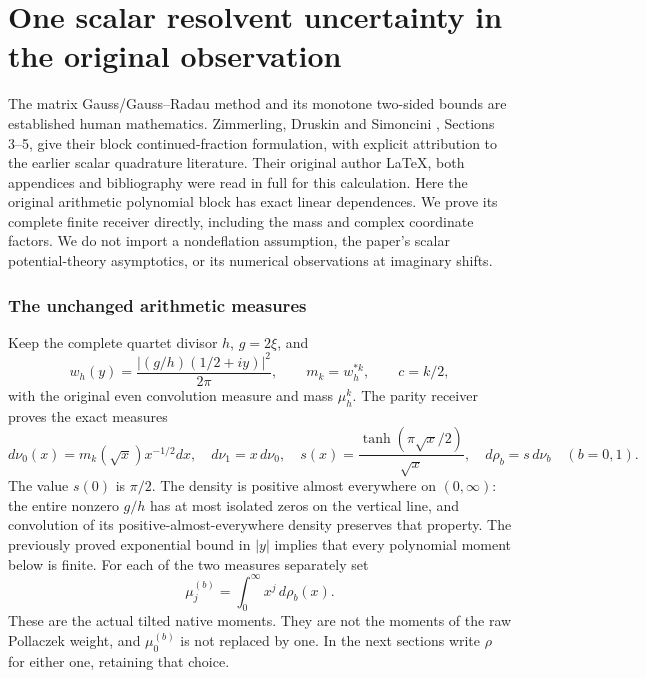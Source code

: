 

\clearpage\begingroup
\part*{One scalar resolvent uncertainty in the original observation}


The matrix Gauss/Gauss--Radau method and its monotone two-sided bounds
are established human mathematics. Zimmerling, Druskin and Simoncini
\cite{rrnative:ZDS}, Sections 3--5, give their block continued-fraction formulation,
with explicit attribution to the earlier scalar quadrature literature.
Their original author LaTeX, both appendices and bibliography were read
in full for this calculation. Here the original arithmetic polynomial
block has exact linear dependences. We prove its complete finite receiver
directly, including the mass and complex coordinate factors. We do not
import a nondeflation assumption, the paper's scalar potential-theory
asymptotics, or its numerical observations at imaginary shifts.

\section{The unchanged arithmetic measures}
Keep the complete quartet divisor $h$, $g=2\xi$, and
\[
 w_h(y)=\frac{|(g/h)(1/2+iy)|^2}{2\pi},\qquad
 m_k=w_h^{*k},\qquad c=k/2,
\]
with the original even convolution measure and mass $\mu_h^k$.
The parity receiver \cite{rrnative:PP} proves the exact measures
\[
 d\nu_0(x)=m_k(\sqrt x)x^{-1/2}dx,\quad d\nu_1=x\,d\nu_0,
 \quad s(x)=\frac{\tanh(\pi\sqrt x/2)}{\sqrt x},\quad
 d\rho_b=s\,d\nu_b\quad(b=0,1).
\]
The value $s(0)$ is $\pi/2$. The density is positive almost everywhere
on $(0,\infty)$: the entire nonzero $g/h$ has at most isolated zeros
on the vertical line, and convolution of its positive-almost-everywhere
density preserves that property. The previously proved exponential
bound in $|y|$ implies that every polynomial moment below is finite.
For each of the two measures separately set
\[
 \mu_j^{(b)}=\int_0^\infty x^j\,d\rho_b(x).
\]
These are the actual tilted native moments. They are not the moments
of the raw Pollaczek weight, and $\mu_0^{(b)}$ is not replaced by one.
In the next sections write $\rho$ for either one, retaining that choice.

